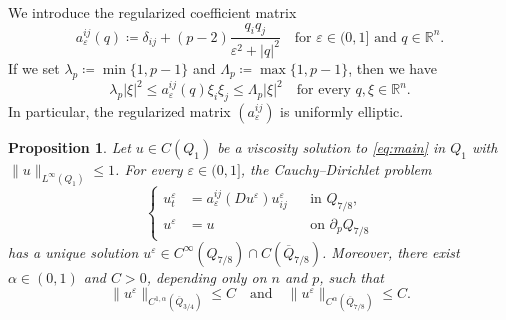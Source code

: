 \documentclass[a4paper,11pt]{amsart}
\theoremstyle{plain}
\newtheorem{proposition}[theorem]{Proposition}
\theoremstyle{definition}
\numberwithin{equation}{section}
\begin{document}
We introduce the regularized coefficient matrix
\begin{equation}\label{eq:matrix}
 a^{ij}_\varepsilon(q)\coloneqq \delta_{ij}+(p-2)\frac{q_iq_j}{\varepsilon^2+|q|^2}
 \quad \text{for $\varepsilon \in (0, 1]$ and $q \in \mathbb{R}^n$}.
\end{equation}
If we set $\lambda_p\coloneqq\min\{1,p-1\}$ and $\Lambda_p\coloneqq\max\{1,p-1\}$, then we have
\begin{equation}\label{eq:ellipticity}
 \lambda_p|\xi|^2
 \leq a_\varepsilon^{ij}(q)\xi_i\xi_j
 \leq\Lambda_p|\xi|^2
 \quad \text{for every $q,\xi\in\mathbb{R}^n$}.
\end{equation}
In particular, the regularized matrix $(a^{ij}_{\varepsilon})$ is uniformly elliptic. 

\begin{proposition}\label{prop:regularized}
Let $u \in C(Q_1)$ be a viscosity solution to \eqref{eq:main} in $Q_1$ with $\|u\|_{L^\infty(Q_1)}\leq1$. For every $\varepsilon\in(0,1]$, the Cauchy--Dirichlet problem
\begin{equation*}
 \left\{\begin{aligned}
  u_t^\varepsilon&=a_\varepsilon^{ij}(Du^\varepsilon)u_{ij}^\varepsilon &&\text{in }Q_{7/8},\\
  u^\varepsilon&=u &&\text{on }\partial_pQ_{7/8}
 \end{aligned}\right.
\end{equation*}
has a unique solution $u^\varepsilon\in C^\infty(Q_{7/8})\cap C(\overline{Q}_{7/8})$. Moreover, there exist $\alpha\in(0,1)$ and $C>0$, depending only on $n$ and $p$, such that
\begin{equation}\label{eq:gradient}
    \|u^\varepsilon\|_{C^{1,\alpha}(\overline{Q}_{3/4})}\leq C \quad \text{and}  \quad \|u^\varepsilon\|_{C^\alpha(\overline{Q}_{7/8})}\leq C.
\end{equation}
\end{proposition}
\end{document}
